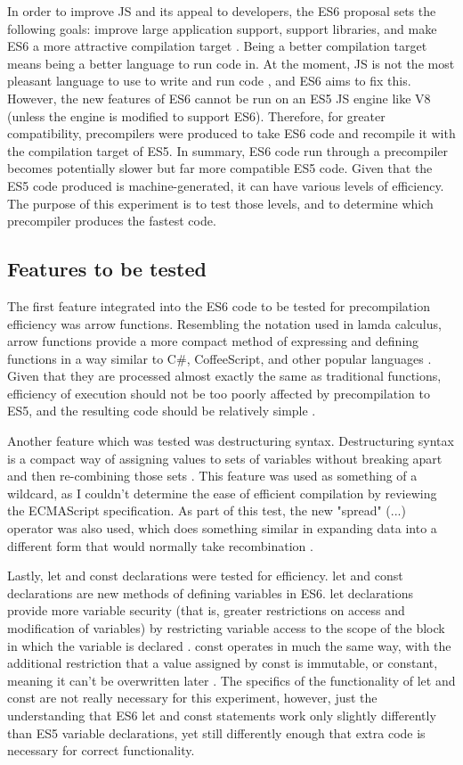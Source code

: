 \documentclass[12pt]{article}
\begin{document}
In order to improve JS and its appeal to developers, the ES6 proposal sets the following goals: improve large application support, support libraries, and make ES6 a more attractive compilation target \cite[xvii]{ecma}. Being a better compilation target means being a better language to run code in. At the moment, JS is not the most pleasant language to use to write and run code \cite{crockpop}, and ES6 aims to fix this. However, the new features of ES6 cannot be run on an ES5 JS engine like V8 (unless the engine is modified to support ES6). Therefore, for greater compatibility, precompilers were produced to take ES6 code and recompile it with the compilation target of ES5. In summary, ES6 code run through a precompiler becomes potentially slower but far more compatible ES5 code. Given that the ES5 code produced is machine-generated, it can have various levels of efficiency. The purpose of this experiment is to test those levels, and to determine which precompiler produces the fastest code.

\subsection{Features to be tested}
The first feature integrated into the ES6 code to be tested for precompilation efficiency was arrow functions. Resembling the notation used in lamda calculus, arrow functions provide a more compact method of expressing and defining functions in a way similar to C\#, CoffeeScript, and other popular languages \cite{hoban}. Given that they are processed almost exactly the same as traditional functions, efficiency of execution should not be too poorly affected by precompilation to ES5, and the resulting code should be relatively simple \cite[86, 249]{ecma}.

Another feature which was tested was destructuring syntax. Destructuring syntax is a compact way of assigning values to sets of variables without breaking apart and then re-combining those sets \cite{hoban}. This feature was used as something of a wildcard, as I couldn't determine the ease of efficient compilation by reviewing the ECMAScript specification. As part of this test, the new "spread" (...) operator was also used, which does something similar in expanding data into a different form that would normally take recombination \cite{hoban}.

Lastly, let and const declarations were tested for efficiency. let and const declarations are new methods of defining variables in ES6. let declarations provide more variable security (that is, greater restrictions on access and modification of variables) by restricting variable access to the scope of the block in which the variable is declared \cite{hoban}. const operates in much the same way, with the additional restriction that a value assigned by const is immutable, or constant, meaning it can't be overwritten later \cite{hoban}. The specifics of the functionality of let and const are not really necessary for this experiment, however, just the understanding that ES6 let and const statements work only slightly differently than ES5 variable declarations, yet still differently enough that extra code is necessary for correct functionality.
\end{document}
